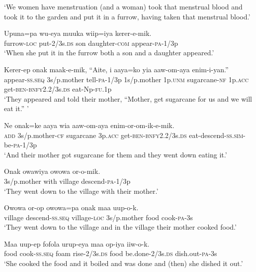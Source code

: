 \glt ‘We women have menstruation (and a woman) took that menstrual blood and took it to the garden and put it in a furrow, having taken that menstrual blood.’ \\
\z


\ea
\gll  Upuna=pa  wu-eya  muuka  wiip=iya  kerer-e-mik. \\
furrow-\textsc{loc}  put-2/3s.\textsc{ds}  son  daughter-\textsc{com}  appear-\textsc{pa}-1/3p \\
\glt ‘When she put it in the furrow both a son and a daughter appeared.’ \\
\z


\ea
\gll  Kerer-ep  onak  maak-e-mik,  “Aite,  i  aaya=ko yia  aaw-om-aya  enim-i-yan.” \\
appear-\textsc{ss.seq}  3s/p.mother  tell-\textsc{pa}-1/3p  1s/p.mother  1p.\textsc{unm}  sugarcane-\textsc{nf} 1p.\textsc{acc}  get-\textsc{ben}-\textsc{bnfy}2.2/3s.\textsc{ds}  eat-Np-\textsc{fu}.1p \\
\glt ‘They appeared and told their mother, “Mother, get sugarcane for us and we will eat it.” ’ \\
\z


\ea
\gll  Ne  onak=ke  aaya  wia  aaw-om-aya                       enim-or-om-ik-e-mik. \\
\textsc{add}  3s/p.mother-\textsc{cf}  sugarcane  3p.\textsc{acc}  get-\textsc{ben}-\textsc{bnfy}2.2/3s.\textsc{ds}  eat-descend-\textsc{ss}.\textsc{sim}-be-\textsc{pa}-1/3p \\


\glt ‘And their mother got sugarcane for them and they went down eating it.’ \\
\z


\ea
\gll  Onak  owawiya  owowa  or-o-mik. \\
3s/p.mother  with  village  descend-\textsc{pa}-1/3p \\
\glt ‘They went down to the village with their mother.’ \\
\z


\ea
\gll  Owowa  or-op  owowa=pa  onak  maa  uup-o-k. \\
village  descend-\textsc{ss.seq}  village-\textsc{loc}  3s/p.mother  food  cook-\textsc{pa}-3s \\
\glt ‘They went down to the village and in the village their mother cooked food.’ \\
\z


\ea
\gll  Maa  uup-ep  fofola  urup-eya  maa  op-iya  iiw-o-k. \\
food  cook-\textsc{ss.seq}  foam  rise-2/3s.\textsc{ds}  food  be.done-2/3s.\textsc{ds}  dish.out-\textsc{pa}-3s \\
\glt ‘She cooked the food and it boiled and was done and (then) she dished it out.’ \\
\z


